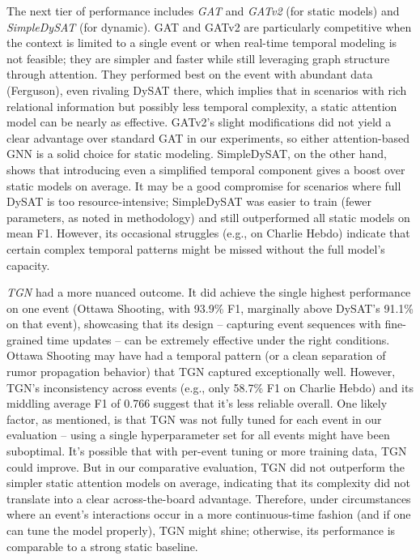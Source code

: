 \documentclass{cshonours}
\begin{document}
The next tier of performance includes \emph{GAT} and \emph{GATv2} (for static models) and \emph{SimpleDySAT} (for dynamic). GAT and GATv2 are particularly competitive when the context is limited to a single event or when real-time temporal modeling is not feasible; they are simpler and faster while still leveraging graph structure through attention. They performed best on the event with abundant data (Ferguson), even rivaling DySAT there, which implies that in scenarios with rich relational information but possibly less temporal complexity, a static attention model can be nearly as effective. GATv2’s slight modifications did not yield a clear advantage over standard GAT in our experiments, so either attention-based GNN is a solid choice for static modeling. SimpleDySAT, on the other hand, shows that introducing even a simplified temporal component gives a boost over static models on average. It may be a good compromise for scenarios where full DySAT is too resource-intensive; SimpleDySAT was easier to train (fewer parameters, as noted in methodology) and still outperformed all static models on mean F1. However, its occasional struggles (e.g., on Charlie Hebdo) indicate that certain complex temporal patterns might be missed without the full model’s capacity.

\emph{TGN} had a more nuanced outcome. It did achieve the single highest performance on one event (Ottawa Shooting, with 93.9\% F1, marginally above DySAT’s 91.1\% on that event), showcasing that its design – capturing event sequences with fine-grained time updates – can be extremely effective under the right conditions. Ottawa Shooting may have had a temporal pattern (or a clean separation of rumor propagation behavior) that TGN captured exceptionally well. However, TGN’s inconsistency across events (e.g., only 58.7\% F1 on Charlie Hebdo) and its middling average F1 of 0.766 suggest that it’s less reliable overall. One likely factor, as mentioned, is that TGN was not fully tuned for each event in our evaluation – using a single hyperparameter set for all events might have been suboptimal. It’s possible that with per-event tuning or more training data, TGN could improve. But in our comparative evaluation, TGN did not outperform the simpler static attention models on average, indicating that its complexity did not translate into a clear across-the-board advantage. Therefore, under circumstances where an event’s interactions occur in a more continuous-time fashion (and if one can tune the model properly), TGN might shine; otherwise, its performance is comparable to a strong static baseline.
\end{document}

